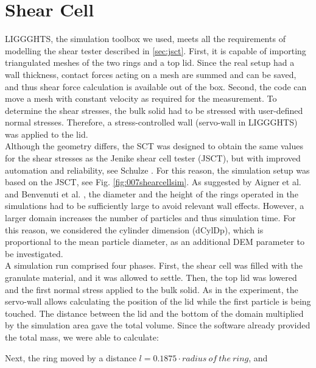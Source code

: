 \section{Shear Cell}
\label{sec:scsimulation}


\acs{LIGGGHTS}, the simulation toolbox we used, meets all the requirements of
modelling the shear tester described in \ref{sec:jsct}. 
First, it is capable of importing triangulated meshes of the two rings and a top lid. 
Since the real setup had a wall thickness, contact forces acting on a mesh are summed and can be saved, 
and thus shear force calculation is available out of the box. 
Second, the code can move a mesh with constant 
velocity as required for the measurement. 
To determine the shear stresses, the bulk solid had to be stressed with 
user-defined normal stresses. 
Therefore, a stress-controlled wall (servo-wall in \acs{LIGGGHTS}) was applied to the lid. \\
Although the geometry differs, the \acs{SCT} was designed to obtain the same values for the shear stresses as the 
Jenike shear cell tester (\acs{JSCT}), but with improved automation and reliability,
see Schulze \cite{RefWorks:118}. 
For this reason, the simulation setup was
based on the \acs{JSCT}, see Fig. \ref{fig:007shearcellsim}.
As suggested by Aigner et al. \cite{RefWorks:139} and Benvenuti et al. \cite{RefWorks:173}, 
the diameter and the height of the rings operated in the simulations had to be sufficiently large to avoid relevant wall effects. 
However, a larger domain increases the number of particles and thus
simulation time.
For this reason, we considered the cylinder dimension (\acs{dCylDp}), which is
proportional to the mean particle diameter, as an additional \acs{DEM}
parameter to be investigated. \\
A simulation run comprised four phases. 
First, the shear cell was filled with the granulate material, and it was allowed
to settle.
Then, the top lid was lowered and the first normal stress applied to the bulk
solid.
As in the experiment, the servo-wall allows calculating the position of the lid
while the first particle is being touched. 
The distance between the lid and the bottom of the domain multiplied by the 
simulation area gave the total volume.
Since the software already provided the total mass, we were able to calculate:

Next, the ring moved by a distance $l=0.1875 \cdot radius ~of ~the ~ring$, and

